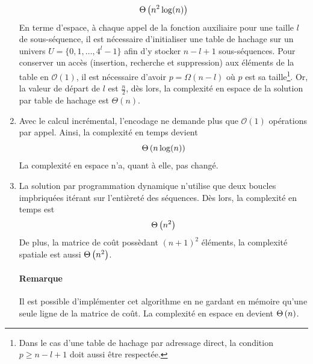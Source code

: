 \documentclass[a4paper, 12pt]{article}
\begin{document}
\begin{enumerate}[label=(\alph*)]
		\begin{equation}
			\Theta\left(n^2 \log(n)\right)
		\end{equation}
		En terme d'espace, à chaque appel de la fonction auxiliaire pour une taille $l$ de sous-séquence, il est nécessaire d'initialiser une table de hachage sur un univers $U = \{0,1,\ldots,4^l-1\}$ afin d'y stocker $n - l + 1$ sous-séquences. Pour conserver un accès (insertion, recherche et suppression) aux éléments de la table en $\mathcal{O}(1)$, il est nécessaire d'avoir $p = \Omega(n - l)$ où $p$ est sa taille\footnote{Dans le cas d'une table de hachage par adressage direct, la condition $p \geq n - l + 1$ doit aussi être respectée.}. Or, la valeur de départ de $l$ est $\frac{n}{2}$, dès lors, la complexité en espace de la solution par table de hachage est $\Theta(n)$.
		\item Avec le calcul incrémental, l'encodage ne demande plus que $\mathcal{O}(1)$ opérations par appel. Ainsi, la complexité en temps devient
		\begin{equation}
			\Theta\left(n \log(n)\right)
		\end{equation}
		La complexité en espace n'a, quant à elle, pas changé.
		\item La solution par programmation dynamique n'utilise que deux boucles impbriquées itérant sur l'entièreté des séquences. Dès lors, la complexité en temps est
		\begin{equation}
			\Theta\left(n^2\right)
		\end{equation}
		De plus, la matrice de coût possèdant $(n + 1)^2$ éléments, la complexité spatiale est aussi $\Theta\left(n^2\right)$.
		\paragraph{Remarque} Il est possible d'implémenter cet algorithme en ne gardant en mémoire qu'une seule ligne de la matrice de coût. La complexité en espace en devient $\Theta\left(n\right)$.
	\end{enumerate}
\end{document}
